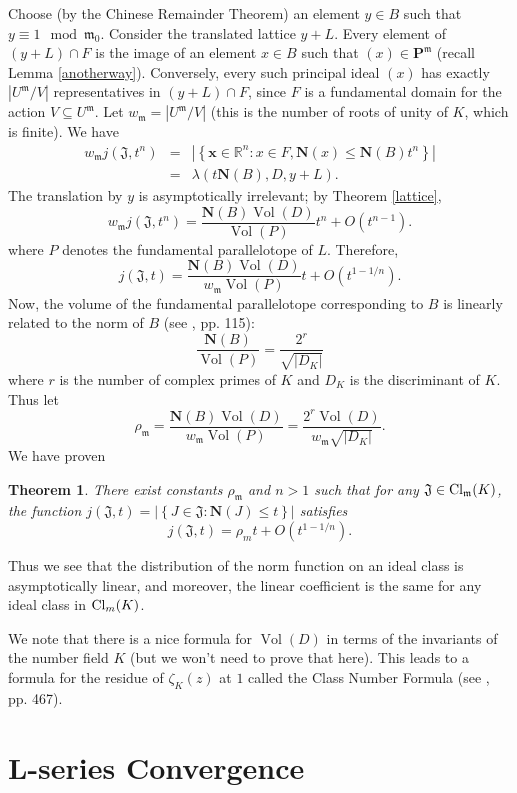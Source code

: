 \documentclass{amsart}
\def\RR{{\mathbb R}}
\def\mf{\mathfrak}
\def\RR{\mathbb{R}}   %
\def\Cl{\textnormal{Cl}}
\def\bP{\textbf{P}}
\def\bN{\textbf{N}}
\newcommand\Vol{\operatorname{Vol}}
\newtheorem{theorem}{Theorem}[section]
\theoremstyle{definition}
\theoremstyle{remark}
\begin{document}
Choose (by the Chinese Remainder Theorem) an element $y \in B$
such that $y \equiv 1 \mod \mf{m}_0$. Consider the translated
lattice $y + L$. Every element of $(y + L) \cap F$ is the image of
an element $x \in B$ such that $(x) \in \bP^\mf{m}$ (recall Lemma
\ref{anotherway}).  Conversely, every such principal ideal $(x)$
has exactly $\left| U^\mf{m} / V \right|$ representatives in $(y +
L) \cap F$, since $F$ is a fundamental domain for the action $V
\subseteq U^\mf{m}$. Let $w_\mf{m} = \left| U^\mf{m} / V \right|$
(this is the number of roots of unity of $K$, which is finite).
We have
\begin{eqnarray*}
w_{\mf{m}} j( \mf{J}, t^n ) & = & \left| \left\{ \mathbf{x} \in
\RR^n : x \in F, \bN(x) \leq \bN(B) t^n \right\} \right| \\
& = & \lambda(t \bN(B), D, y + L).
\end{eqnarray*}
The translation by $y$ is asymptotically irrelevant; by Theorem
\ref{lattice},
\[
w_\mf{m} j( \mf{J}, t^n ) = \frac{\bN(B)\Vol (D)}{\Vol (P)} t^n +
O(t^{n-1}).
\]
where $P$ denotes the fundamental parallelotope of $L$.
Therefore,
\[
j( \mf{J}, t) = \frac{\bN(B)\Vol (D)}{w_\mf{m} \Vol (P)} t +
O(t^{1-1/n}).
\]
Now, the volume of the fundamental parallelotope corresponding to
$B$ is linearly related to the norm of $B$ (see \cite{lang}, pp.
115):
\[
\frac{\bN(B)}{\Vol (P)} = \frac{2^r}{\sqrt{\left| D_K \right|}}
\]
where $r$ is the number of complex primes of $K$ and $D_K$ is the
discriminant of $K$.  Thus let
\[
\rho_\mf{m} = \frac{\bN(B)\Vol (D)}{w_\mf{m} \Vol (P)} = \frac{2^r
\Vol(D)}{w_\mf{m} \sqrt{\left| D_K \right|}}.
\]
We have proven
\begin{theorem}
\label{asymp} There exist constants $\rho_\mf{m}$ and $n > 1$ such
that for any $\mf{J} \in \Cl_\mf{m} (K)$, the function $j(\mf{J},
t) = \left| \left\{ J \in \mf{J} : \bN(J) \leq t \right\}
\right|$ satisfies
\[
j(\mf{J}, t) = \rho_m t + O(t^{1 - 1/n}).
\]
\end{theorem}

Thus we see that the distribution of the norm function on an
ideal class is asymptotically linear, and moreover, the linear
coefficient is the same for any ideal class in $\Cl_m(K)$.

We note that there is a nice formula for $\Vol(D)$ in terms of the
invariants of the number field $K$ (but we won't need to prove
that here). This leads to a formula for the residue of
$\zeta_K(z)$ at $1$ called the Class Number Formula (see
\cite{neukirch}, pp. 467).

\section{L-series Convergence}
\end{document}
